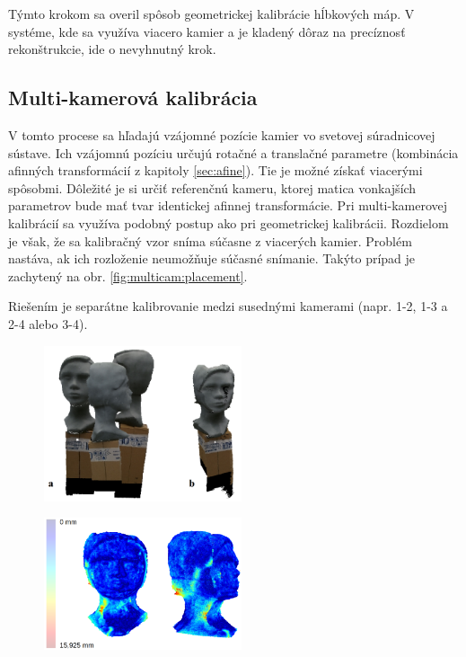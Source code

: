 Týmto krokom sa overil spôsob geometrickej kalibrácie hĺbkových máp. V systéme, kde sa využíva viacero kamier a je kladený dôraz na precíznosť rekonštrukcie, ide o nevyhnutný krok. 


\subsection{Multi-kamerová kalibrácia}

V tomto procese sa hľadajú vzájomné pozície kamier vo svetovej súradnicovej sústave. Ich vzájomnú pozíciu určujú rotačné a translačné parametre (kombinácia afinných transformácií z kapitoly \ref{sec:afine}). Tie je možné získať viacerými spôsobmi. Dôležité je si určiť referenčnú kameru, ktorej matica vonkajších parametrov bude mať tvar identickej afinnej transformácie. Pri multi-kamerovej kalibrácií sa využíva podobný postup ako pri geometrickej kalibrácii. Rozdielom je však, že sa kalibračný vzor sníma súčasne z viacerých kamier. Problém nastáva, ak ich rozloženie neumožňuje súčasné snímanie. Takýto prípad je zachytený na obr. \ref{fig:multicam:placement}.

Riešením je separátne kalibrovanie medzi susednými kamerami (napr. 1-2, 1-3 a 2-4 alebo 3-4). 

\begin{figure}[H]
	\centering
	\includegraphics[width=0.52\textwidth]{figures/calibration_multi.jpg}
	\caption{}
	\label{fig:calib:haus:single}
\end{figure}

\begin{figure}[H]
	\centering
	\includegraphics[width=0.52\textwidth]{figures/calibration_hausdorff_multi.jpg}
	\caption{}
	\label{fig:calib:haus:single}
\end{figure}



